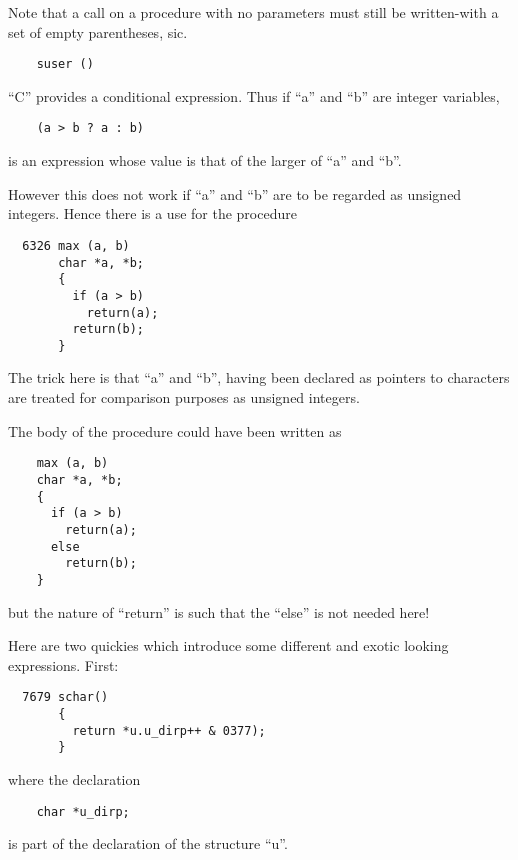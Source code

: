 Note that a call on a procedure with no
parameters must still be written-with a
set of empty parentheses, sic.

\begin{verbatim}
    suser ()
\end{verbatim}


``C'' provides a conditional expression.
Thus if ``a'' and ``b'' are integer variables,

\begin{verbatim}
    (a > b ? a : b)
\end{verbatim}

\noindent is an expression whose value is that of
the larger of ``a'' and ``b''.

However this does not work if ``a'' and
``b'' are to be regarded as unsigned
integers. Hence there is a use for the
procedure

\begin{verbatim}
  6326 max (a, b)
       char *a, *b;
       {
         if (a > b)
           return(a);
         return(b);
       }
\end{verbatim}

The trick here is that ``a'' and ``b'',
having been declared as pointers to
characters are treated for comparison
purposes as unsigned integers.

The body of the procedure could have
been written as

\begin{verbatim}
    max (a, b)
    char *a, *b;
    {
      if (a > b)
        return(a);
      else
        return(b);
    }
\end{verbatim}

\noindent but the nature of ``return'' is such that
the ``else'' is not needed here!



Here are two quickies which introduce
some different and exotic looking
expressions. First:

\begin{verbatim}
  7679 schar()
       {
         return *u.u_dirp++ & 0377);
       }
\end{verbatim}

\noindent where the declaration

\begin{verbatim}
    char *u_dirp;
\end{verbatim}

\noindent is part of the declaration of the
structure ``u''.

